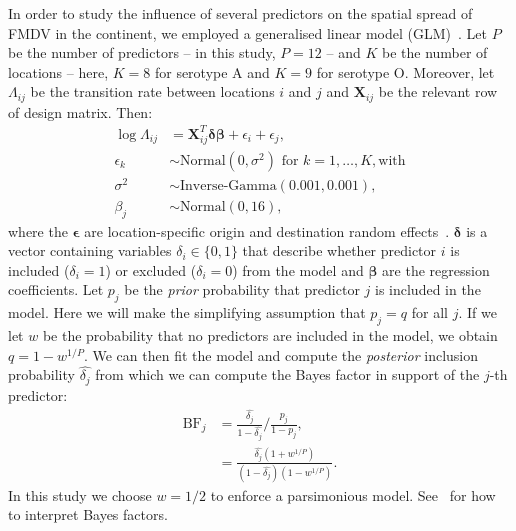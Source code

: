 \documentclass[a4paper,10pt]{article}
\begin{document}
In order to study the influence of several predictors on the spatial spread of FMDV in the continent, we employed a generalised linear model (GLM)~\citep{M-Lemey2014,M-Dudas2017}.
Let $P$ be the number of predictors -- in this study, $P = 12$ -- and $K$ be the number of locations -- here, $K = 8$ for serotype A and $K = 9$ for serotype O.
Moreover, let $\Lambda_{ij}$ be the transition rate between locations $i$ and $j$ and $\boldsymbol X_{ij}$ be the relevant row of design matrix.
Then:
\begin{align*}
 \log \Lambda_{ij}  &= \boldsymbol X_{ij}^T \boldsymbol\delta \boldsymbol{\beta}
+ \epsilon_i + \epsilon_j, \\
\epsilon_k &\sim \text{Normal}(0, \sigma^2) \text{ for } k = 1, \ldots, K, \text{with} \\
\sigma^2 &\sim \text{Inverse-Gamma}(0.001, 0.001),\\
\beta_j &\sim \text{Normal}(0, 16),
\end{align*}
where the $\boldsymbol\epsilon$ are location-specific origin and destination random effects~\citep{M-Dudas2017}.
$\boldsymbol\delta$ is a vector containing variables $\delta_i \in \{0, 1\}$ that describe whether predictor $i$ is included ($\delta_i = 1$) or excluded ($\delta_i = 0$) from the model and $\boldsymbol\beta$ are the regression coefficients.
Let $p_j$ be the \textit{prior} probability that predictor $j$ is included in the model.
Here we will make the simplifying assumption that $p_j = q$ for all $j$.
If we let $w$ be the probability that no predictors are included in the model, we obtain  $q = 1 - w^{1/P}$.
We can then fit the model and compute the \textit{posterior} inclusion probability $\hat{\delta_j}$ from which we can compute the Bayes factor in support of the $j$-th predictor:
\begin{align*}
 \text{BF}_j &= \frac{\hat{\delta_j} }{1-\hat{\delta_j} }/\frac{p_j}{1-p_j}, \\
  &= \frac{\hat{\delta_j} (1 + w^{1/P})}{(1-\hat{\delta_j})(1 - w^{1/P}) }.
\end{align*}
In this study we choose $w = 1/2$ to enforce a parsimonious model.
See~\citet{M-KassRaftery1995} for how to interpret Bayes factors.



\end{document}
